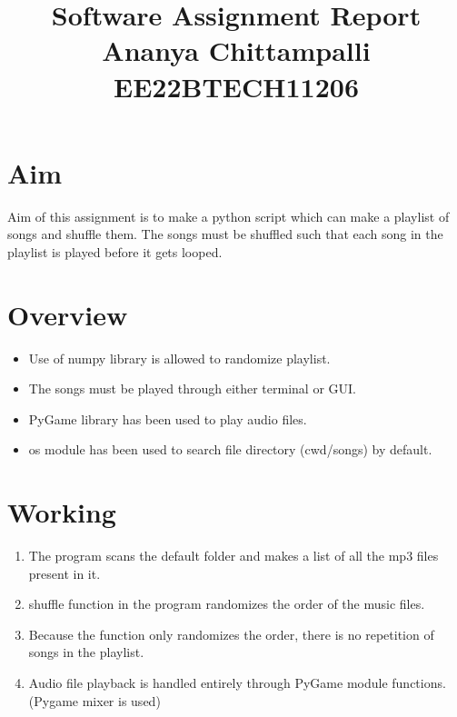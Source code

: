 \documentclass{article}
\begin{document}
\title{Software Assignment Report\\ \large{Ananya Chittampalli\\EE22BTECH11206}}
\author{}
\date{}
\maketitle

\maketitle

\section*{Aim}
Aim of this assignment is to make a python script which can make a playlist of songs and shuffle them. The songs must be shuffled such that each song in the playlist is played before it gets looped.

\section{Overview}
\begin{itemize}
    \item Use of numpy library is allowed to randomize playlist.
    \item The songs must be played through either terminal or GUI.
    \item PyGame library has been used to play audio files.
    \item os module has been used to search file directory (cwd/songs) by default.
\end{itemize}

\section{Working}
\begin{enumerate}
    \item The program scans the default folder and makes a list of all the mp3 files present in it.
    \item shuffle function in the program randomizes the order of the music files.
    \item Because the function only randomizes the order, there is no repetition of songs in the playlist.
    \item Audio file playback is handled entirely through PyGame module functions. (Pygame mixer is used)
\end{enumerate}
\end{document}
